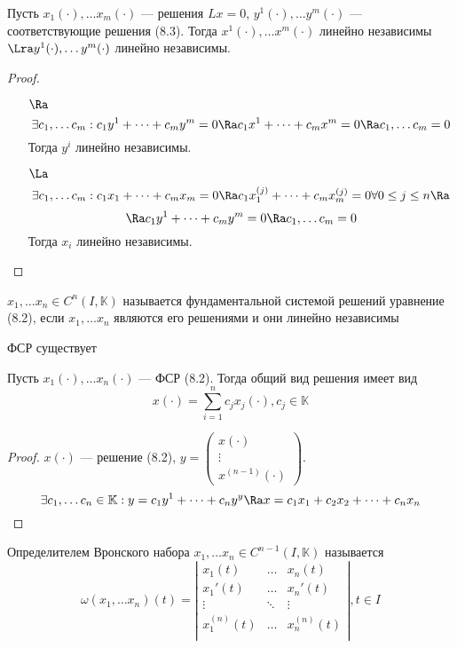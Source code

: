 \begin{lemma}
    Пусть \(x_1(\cdot), \dots x_m(\cdot)\) --- решения \(Lx = 0\), \(y^1(\cdot), \dots y^m(\cdot)\) --- соответствующие решения (8.3). Тогда \(x^1(\cdot), \dots x^m(\cdot)\) линейно независимы \(\Lra y^1(\cdot), \dots y^m(\cdot)\) линейно независимы.
\end{lemma}
\begin{proof}\indent
    \begin{enumerate}
        \item[\(\Ra\)]
        \[\exists c_1, \dots c_m: c_1y^1 + \dots + c_my^m = 0 \Ra c_1x^1 + \dots + c_mx^m = 0 \Ra c_1, \dots c_m = 0\] 
        Тогда \(y^i\) линейно независимы.
        \item[\(\La\)]
        \[\exists c_1, \dots c_m: c_1x_1 + \dots + c_mx_m = 0 \Ra c_1x^{(j)}_1 + \dots + c_mx^{(j)}_m = 0 \forall 0 \le j \le n \Ra\]
        \[\Ra c_1y^1 + \dots + c_my^m = 0 \Ra c_1, \dots c_m = 0\]
        Тогда \(x_i\) линейно независимы.
    \end{enumerate}
\end{proof}

\begin{definition}
    \(x_1, \dots x_n \in C^n(I, \mathbb{K})\) называется фундаментальной системой решений уравнение (8.2), если \(x_1, \dots x_n\) являются его решениями и они линейно независимы
\end{definition}

\begin{corollary}[Из леммы]
    ФСР существует
\end{corollary}

\begin{theorem}
    Пусть \(x_1(\cdot), \dots x_n(\cdot)\) --- ФСР (8.2). Тогда общий вид решения имеет вид
    \[x(\cdot) = \sum_{i = 1}^n c_jx_j(\cdot), c_j \in \mathbb{K}\]
\end{theorem}
\begin{proof}
    \(x(\cdot)\) --- решение (8.2), \(y = \left( \begin{array}{c}
        x(\cdot) \\
        \vdots \\
        x^{(n - 1)}(\cdot)
    \end{array} \right)\).
    \[\exists c_1, \dots c_n \in \mathbb{K}: y = c_1y^1 + \dots + c_ny^y \Ra x = c_1x_1 + c_2x_2 + \dots + c_nx_n\]
\end{proof}

\begin{definition}
    Определителем Вронского набора \(x_1, \dots x_n \in C^{n - 1}(I, \mathbb{K})\) называется
    \[\omega(x_1, \dots x_n)(t) = \left| \begin{array}{ccc}
        x_1(t) & \dots & x_n(t) \\
        x_1'(t) & \dots & x_n'(t) \\
        \vdots & \ddots & \vdots \\
        x_1^{(n)}(t) & \dots & x_n^{(n)}(t) \\
    \end{array} \right|, t \in I\]
\end{definition}

